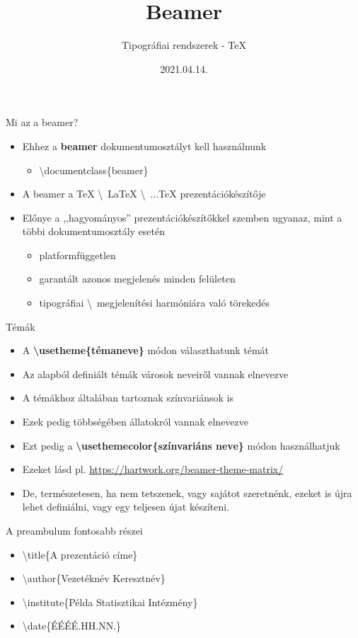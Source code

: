 \documentclass[11pt]{beamer}
\author{Tipográfiai rendszerek - \TeX}
\title{Beamer}
\date{2021.04.14.}
\newcommand{\tbs}{\textbackslash}
\begin{document}
\begin{frame}
\titlepage
\end{frame}

\begin{frame}{Mi az a beamer?}
\begin{itemize}
\item Ehhez a \textbf{beamer} dokumentumosztályt kell használnunk
	\begin{itemize}
	\item \tbs documentclass\{beamer\}
	\end{itemize}
\item A beamer a \TeX{} \tbs \  \LaTeX{} \tbs \  ...\TeX{} prezentációkészítője
\item Előnye a ,,hagyományos'' prezentációkészítőkkel szemben ugyanaz, mint a többi dokumentumosztály esetén
	\begin{itemize}
	\item platformfüggetlen
	\item garantált azonos megjelenés minden felületen
	\item tipográfiai \tbs \ megjelenítési harmóniára való törekedés
	\end{itemize}
\end{itemize}
\end{frame}

\begin{frame}{Témák}
\begin{itemize}
\item A \textbf{\tbs usetheme\{témaneve\}} módon választhatunk témát
\item Az alapból definiált témák városok neveiről vannak elnevezve
\item A témákhoz általában tartoznak színvariánsok is
\item Ezek pedig többségében állatokról vannak elnevezve
\item Ezt pedig a \textbf{\tbs usethemecolor\{színvariáns neve\}} módon használhatjuk
\item Ezeket lásd pl. \url{https://hartwork.org/beamer-theme-matrix/}
\item De, természetesen, ha nem tetszenek, vagy sajátot szeretnénk, ezeket is újra lehet definiálni, vagy egy teljesen újat készíteni.
\end{itemize}
\end{frame}

\begin{frame}{A preambulum fontosabb részei}
\begin{itemize}
\item \tbs title\{A prezentáció címe\}
\item \tbs author\{Vezetéknév Keresztnév\}
\item \tbs institute\{Példa Statisztikai Intézmény\}
\item \tbs date\{ÉÉÉÉ.HH.NN.\}
\end{itemize}
\end{frame}
\end{document}
